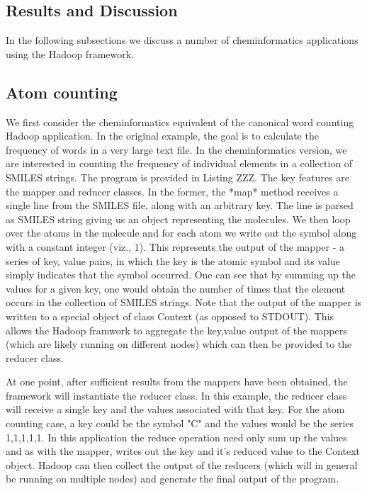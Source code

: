 \documentclass[10pt]{bmc_article}
\newenvironment{bmcformat}{\begin{raggedright}\baselineskip20pt\sloppy\setboolean{publ}{false}}{\end{raggedright}\baselineskip20pt\sloppy}
\begin{document}
\begin{bmcformat}
\section*{Results and Discussion}

In the following subsections we discuss a number of cheminformatics
applications using the Hadoop framework.

\subsection*{Atom counting}
\label{sec:atom-counting}

We first consider the cheminformatics equivalent of the canonical word counting Hadoop application. In the original example, the goal is to calculate the frequency of words in a very large text file. In the cheminformatics version, we are interested in counting the frequency of individual elements in a collection of SMILES strings. The program is provided in Listing ZZZ. The key features are the mapper and reducer classes. In the former, the *map* method receives a single line from the SMILES file, along with an arbitrary key. The line is parsed as SMILES string giving us an object representing the molecules.  We then loop over the atoms in the molecule and for each atom we write out the symbol along with a constant integer (viz., 1). This represents the output of the mapper - a series of key, value pairs, in which the key is the atomic symbol and its value simply indicates that the symbol occurred. One can see that by summing up the values for a given key, one would obtain the number of times that the element occurs in the collection of SMILES strings. Note that the output of the mapper is written to a special object of class Context (as opposed to STDOUT). This allows the Hadoop framwork to aggregate the key,value output of the mappers (which are likely running on different nodes) which can then be provided to the reducer class.

At one point, after sufficient results from the mappers have been obtained, the framework will instantiate the reducer class. In this example, the reducer class will receive a single key and the values associated with that key. For the atom counting case, a key could be the symbol "C" and the values would be the series {1,1,1,1,1}. In this application the reduce operation need only sum up the values and as with the mapper, writes out the key and it's reduced value to the Context object. Hadoop can then collect the output of the reducers (which will in general be running on multiple nodes) and generate the final output of the program.


\end{bmcformat}
\end{document}
